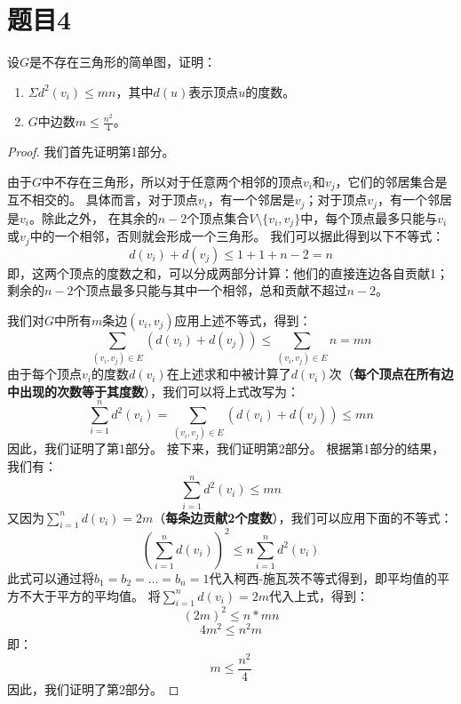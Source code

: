 \documentclass[utf8]{ctexart}
\theoremstyle{mystyle}
\begin{document}
\section*{题目4}
\begin{problembox}
  设$G$是不存在三角形的简单图，证明：
  \begin{enumerate}
    \item $\Sigma d^2(v_i) \leq mn$，其中$d(u)$表示顶点$u$的度数。
    \item $G$中边数$m \leq  \frac{n^2}{4} $。
  \end{enumerate}
\end{problembox}
\begin{proof}
我们首先证明第1部分。

由于$G$中不存在三角形，所以对于任意两个相邻的顶点$v_i$和$v_j$，它们的邻居集合是互不相交的。
具体而言，对于顶点$v_i$，有一个邻居是$v_j$；对于顶点$v_j$，有一个邻居是$v_i$。除此之外，
在其余的$n-2$个顶点集合$V \setminus \{v_i, v_j\}$中，每个顶点最多只能与$v_i$或$v_j$中的一个相邻，否则就会形成一个三角形。
我们可以据此得到以下不等式：
\[d(v_i) + d(v_j) \leq 1 + 1 + n - 2 = n\]
即，这两个顶点的度数之和，可以分成两部分计算：他们的直接连边各自贡献1；剩余的$n-2$个顶点最多只能与其中一个相邻，总和贡献不超过$n-2$。

我们对$G$中所有$m$条边$(v_i, v_j)$应用上述不等式，得到：
\[\sum_{(v_i, v_j) \in E} (d(v_i) + d(v_j)) \leq \sum_{(v_i, v_j) \in E} n = mn\]
由于每个顶点$v_i$的度数$d(v_i)$在上述求和中被计算了$d(v_i)$次（\textbf{每个顶点在所有边中出现的次数等于其度数}），我们可以将上式改写为：
\[\sum_{i=1}^{n} d^2(v_i) = \sum_{(v_i, v_j) \in E} (d(v_i) + d(v_j)) \leq mn\]
因此，我们证明了第1部分。
接下来，我们证明第2部分。
根据第1部分的结果，我们有：
\[\sum_{i=1}^{n} d^2(v_i) \leq mn\]
又因为$\sum_{i=1}^{n} d(v_i) = 2m$（\textbf{每条边贡献2个度数}），我们可以应用下面的不等式：
\[\left(\sum_{i=1}^{n} d(v_i)\right)^2 \leq n \sum_{i=1}^{n} d^2(v_i)\]
此式可以通过将$ b_1 = b_2 = \ldots = b_n = 1 $代入柯西-施瓦茨不等式得到，即平均值的平方不大于平方的平均值。
将$\sum_{i=1}^{n} d(v_i) = 2m$代入上式，得到：
\[(2m)^2 \leq n * mn\]
\[4m^2 \leq n^2 m\]
即：
\[m \leq \frac{n^2}{4}\]
因此，我们证明了第2部分。

\end{proof}
\end{document}
